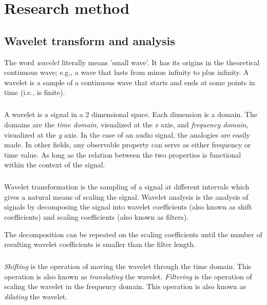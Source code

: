 \chapter{Research method}
\label{method}

\section{Wavelet transform and analysis}
The word \emph{wavelet }\rm literally means 'small wave'. It has its origins in
the theoretical continuous wave; e.g., a wave that lasts from minus infinity
to plus infinity. A wavelet is a sample of a continuous wave that starts and
ends at some points in time (i.e., is finite).

\paragraph{}
A wavelet is a signal in a 2 dimensional space. Each dimension is a domain. The
domains are the \emph{time domain}\rm, visualized at the \emph{x }\rm axis,
and \emph{frequency domain}\rm, visualized at the \emph{y }\rm axis.
In the case of an audio signal, the analogies are easily made. In other fields, any
observable property can serve as either frequency or time value. As long as the
relation between the two properties is functional within the context of the
signal.

\paragraph{}
Wavelet transformation is the sampling of a signal at different intervals which
gives a natural means of scaling the signal. Wavelet analysis is the analysis of
signals by decomposing the signal into wavelet coefficients (also known as shift
coefficients) and scaling coefficients (also known as filters).

The decomposition can be repeated on the scaling coefficients until the number
of resulting wavelet coefficients is smaller than the filter length.

\paragraph{}
\emph{Shifting }\rm is the operation of moving the wavelet through the time
domain. This operation is also known as \emph{translating }\rm the wavelet.
\emph{Filtering }\rm is the operation of scaling the wavelet in the frequency
domain. This operation is also known as \emph{dilating }\rm the wavelet.

